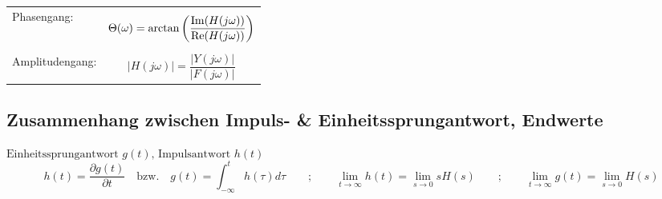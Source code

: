 \begin{tabular}{ll}
	Phasengang: & 
	\begin{equation}
		\Theta(\omega) = \arctan \left(\frac{\operatorname{Im} (H(j\omega))}{\operatorname{Re} (H(j\omega))}\right) \nonumber
	\end{equation} \\
	Amplitudengang: &
	\begin{equation}
		|H(j\omega)| = \frac{|Y(j\omega)|}{|F(j\omega)|} \nonumber
	\end{equation}
\end{tabular}



\subsection{Zusammenhang zwischen Impuls- \& Einheitssprungantwort, Endwerte
}
$ \text{Einheitssprungantwort } g(t) \text{, Impulsantwort }h(t)$
$$h(t)= \frac{\partial g(t)}{\partial t}\quad\text{bzw.}\quad
g(t)=\int_{-\infty}^{t}h(\tau)d\tau \qquad;\qquad 
\lim\limits_{t \rightarrow \infty}  h(t)= \lim\limits_{s \rightarrow 0} s H(s)
\qquad;\qquad
\lim\limits_{t \rightarrow \infty}  g(t)= \lim\limits_{s \rightarrow 0} H(s)$$

\newpage


